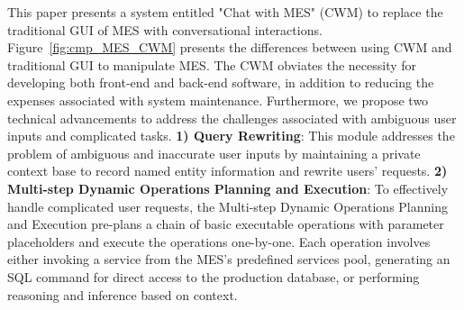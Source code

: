 \documentclass[preprint,12pt]{elsarticle}
\begin{document}
This paper presents a system entitled "Chat with MES" (CWM) to replace the traditional GUI of MES with conversational interactions.
Figure~\ref{fig:cmp_MES_CWM} presents the differences between using CWM and traditional GUI to manipulate MES.
The CWM obviates the necessity for developing both front-end and back-end software, in addition to reducing the expenses associated with system maintenance.
Furthermore, we propose two technical advancements to address the challenges associated with ambiguous user inputs and complicated tasks.
\textbf{1) Query Rewriting}: This module addresses the problem of ambiguous and inaccurate user inputs by maintaining a private context base to record named entity information and rewrite users' requests. 
\textbf{2) Multi-step Dynamic Operations Planning and Execution}: 
To effectively handle complicated user requests, the Multi-step Dynamic Operations Planning and Execution pre-plans a chain of basic executable operations with parameter placeholders and execute the operations one-by-one.
Each operation involves either invoking a service from the MES's predefined services pool, generating an SQL command for direct access to the production database, or performing reasoning and inference based on context.
\end{document}
